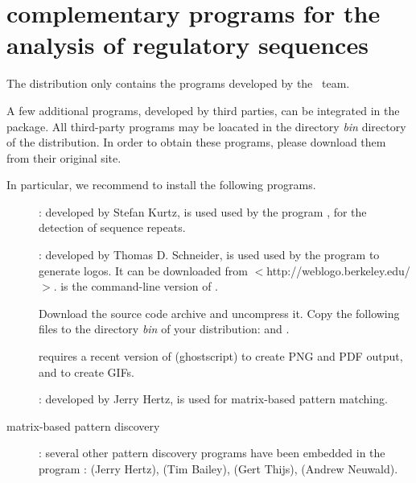 \documentclass[12pt,a4paper, oneside]{scrreprt} %
\begin{document}
\section{complementary programs for the analysis of regulatory
  sequences}

The \RSAT distribution only contains the programs developed by the
\RSAT \ team. 

A few additional programs, developed by third parties, can be
integrated in the package. All third-party programs may be loacated in
the directory \emph{bin} directory of the \RSAT distribution. In order
to obtain these programs, please download them from their original
site.

In particular, we recommend to install the following programs.

\begin{description}
\item[]: developed by Stefan Kurtz, is used used by the
program , for the detection of sequence repeats.

\item[]:  developed by Thomas D. Schneider, is used
used by the program  to generate logos. It can
be downloaded from $<$http://weblogo.berkeley.edu/$>$.  is
the command-line version of .

Download the source code archive and uncompress it. Copy the following
 files to the directory \emph{bin} of your \RSAT distribution:
 and .

 requires a recent version of 
(ghostscript) to create PNG and
PDF output, and  to create GIFs.

\item[]: developed by Jerry Hertz, is used for
  matrix-based pattern matching.

\item[matrix-based pattern discovery]: several other pattern discovery
  programs have been embedded in the \RSAT program
  :
 (Jerry Hertz),
 (Tim Bailey),
 (Gert Thijs),
 (Andrew Neuwald).


\end{description}
\end{document}
